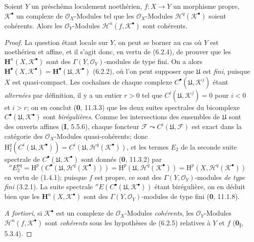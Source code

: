 \begin{proposition}[6.2.5]
Soient $Y$ un préschéma localement noethérien, $f:X\to Y$ un morphisme
propre, $\mathscr K^\bullet$ un complexe de $\mathscr O_X$-Modules tel que les
$\mathscr O_X$-Modules $\mathscr H^q(\mathscr K^\bullet)$ soient cohérents.
Alors les $\mathscr O_Y$-Modules $\mathscr H^n(f,\mathscr K^\bullet)$ sont
cohérents.
\end{proposition}

\begin{proof}
La question étant locale sur $Y$, on peut se borner au cas où $Y$ est
noethérien et affine, et il s'agit donc, en vertu de (6.2.4), de prouver que
les $\mathbf H^n(X,\mathscr K^\bullet)$ sont des
$\Gamma(Y,\mathscr O_Y)$-modules de type fini. On a alors
$\mathbf H^\bullet(X,\mathscr K^\bullet)=
\mathbf H^\bullet(\mathfrak U,\mathscr K^\bullet)$ (6.2.2), où l'on peut
supposer que $\mathfrak U$ est \emph{fini}, puisque $X$ est quasi-compact. Les
cochaînes de chaque complexe $C^\bullet(\mathfrak U,\mathscr K^j)$ étant
\emph{alternées} par définition, il y a un entier $r>0$ tel que
$C^i(\mathfrak U,\mathscr K^j)=0$ pour $i<0$ et $i>r$; on en conclut
(\textbf{0}, 11.3.3) que les deux suites spectrales du bicomplexe
$C^\bullet(\mathfrak U,\mathscr K^\bullet)$ sont \emph{birégulières}. Comme les
intersections des ensembles de $\mathfrak U$ sont des ouverts affines
(\textbf{I}, 5.5.6), chaque foncteur
$\mathscr F\leadsto C^i(\mathfrak U,\mathscr F)$ est exact dans la catégorie
des $\mathscr O_X$-Modules quasi-cohérents; donc
$\mathrm H_I^q(C^i(\mathfrak U,\mathscr K^\bullet))
=C^i(\mathfrak U,\mathscr H^q(\mathscr K^\bullet))$, et les termes
$E_2$ de la seconde suite spectrale de
$C^\bullet(\mathfrak U,\mathscr K^\bullet)$ sont donnés (\textbf{0}, 11.3.2) par
\[
  ''E_2^{pq}
  =\mathrm H^p(C^\bullet(\mathfrak U,\mathscr H^q(\mathscr K^\bullet)))
  =\mathrm H^p(\mathfrak U,\mathscr H^q(\mathscr K^\bullet))
  =\mathrm H^p(X,\mathscr H^q(\mathscr K^\bullet))
\]
en vertu de (1.4.1); puisque $f$ est propre, ce sont des
$\Gamma(Y,\mathscr O_Y)$-modules \emph{de type fini} (3.2.1). La suite spectrale
$''E(C^\bullet(\mathfrak U,\mathscr K^\bullet))$ étant birégulière, on en
déduit bien que les $\mathbf H^n(X,\mathscr K^\bullet)$ sont des
$\Gamma(Y,\mathscr O_Y)$-modules de type fini (\textbf{0}, 11.1.8).

\emph{A fortiori}, si $\mathscr K^\bullet$ est un complexe de
$\mathscr O_X$-Modules \emph{cohérents}, les $\mathscr O_Y$-Modules
$\mathscr H^n(f,\mathscr K^\bullet)$ sont \emph{cohérents} sous les hypothèses de
(6.2.5) relatives à $Y$ et $f$ (\textbf{0}\textsubscript{I}, 5.3.4).
\end{proof}

